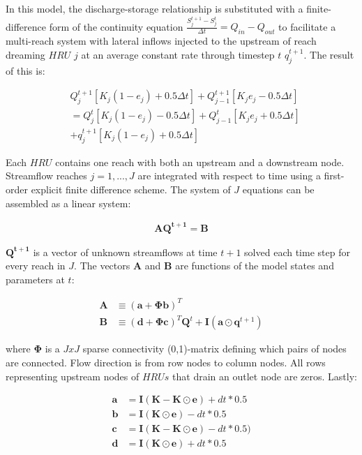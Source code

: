 In this model, the discharge-storage relationship is substituted with a finite-difference form of the continuity equation $\frac{S_j^{t+1} - S_j^{t}}{\Delta t} = Q_{in} - Q_{out}$ to facilitate a multi-reach system with lateral inflows injected to the upstream of reach dreaming $HRU$ $j$ at an average constant rate through timestep $t$ $q_{j}^{t+1}$. The result of this is:

\begin{align}
&Q_j^{t+1}\left[K_j(1 - e_j) + 0.5\Delta t  \right] + Q_{j-1}^{t+1}\left[K_je_j - 0.5\Delta t  \right]  \\
&= Q_j^{t}\left[K_j(1 - e_j) - 0.5\Delta t  \right] + Q_{j-1}^{t}\left[K_je_j + 0.5\Delta t  \right]\\
&+ q_{j}^{t+1}\left[K_j(1 - e_j) + 0.5\Delta t  \right]
\end{align}

Each $HRU$ contains one reach with both an upstream and a downstream node. Streamflow reaches $j=1,...,J$ are integrated with respect to time using a first-order explicit finite difference scheme. The system of $J$ equations can be assembled as a linear system:   

\begin{align}\label{eq:linearsystem}
\mathbf{A}\mathbf{Q^{t+1}} = \mathbf{B}
\end{align}

$\mathbf{Q^{t+1}}$ is a vector of unknown streamflows at time $t+1$ solved each time step for every reach in $J$. The vectors $\mathbf{A}$ and $\mathbf{B}$ are functions of the model states and parameters at $t$:

\begin{align}
\mathbf{A}&\equiv (\mathbf{a} + \mathbf{\Phi} \mathbf{b})^T\\
\mathbf{B}&\equiv (\mathbf{d} + \mathbf{\Phi}\mathbf{c})^T\mathbf{Q}^t + \mathbf{I}(\mathbf{a\odot q}^{t+1})
\end{align}

where $\mathbf{\Phi}$ is a $JxJ$ sparse connectivity (0,1)-matrix defining which pairs of nodes are connected. Flow direction is from row nodes to column nodes. All rows representing upstream nodes of $HRUs$ that drain an outlet node are zeros. Lastly:

\begin{align}
\mathbf{a} &= \mathbf{I} (\mathbf{K}-\mathbf{K\odot e}) + dt * 0.5\\
\mathbf{b} &= \mathbf{I} (\mathbf{K\odot e}) - dt * 0.5\\
\mathbf{c} &= \mathbf{I} (\mathbf{K}-\mathbf{K\odot e}) - dt * 0.5)\\
\mathbf{d} &= \mathbf{I} (\mathbf{K\odot e}) + dt * 0.5
\end{align}


